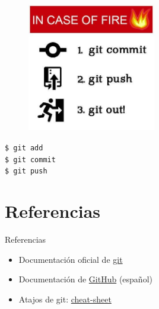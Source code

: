 \documentclass{beamer}
\begin{document}
  



\begin{frame}

\begin{figure}
  \includegraphics[width = 0.5\textwidth]{images/meme-git.jpg}
\end{figure}

\begin{block}{}
  {\texttt{\$ git add  }} \\
  {\texttt{\$ git commit  }} \\
  {\texttt{\$ git push }}
\end{block}

\end{frame}



\section{Referencias}

\begin{frame}{Referencias}

  \begin{itemize}
    
    \item Documentación oficial de \href{https://git-scm.com}{git} 
    \item Documentación de \href{https://docs.github.com/es}{GitHub} (español)
    \item Atajos de git: \href{https://training.github.com/downloads/es_ES/github-git-cheat-sheet/}{cheat-sheet}
  \end{itemize}

\end{frame}
\end{document}
